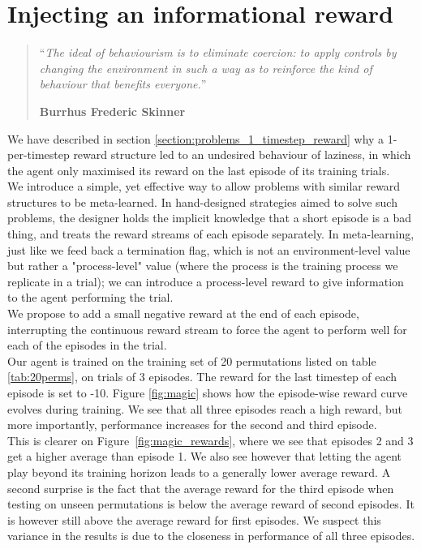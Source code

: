 \chapter{Injecting an informational reward}
\begin{quotation}
\noindent ``\emph{The ideal of behaviourism is to eliminate coercion: to apply
	controls by changing the environment in such a way as to reinforce the
	kind of behaviour that benefits everyone.}''
\begin{flushright}\textbf{Burrhus Frederic Skinner}\end{flushright}
\end{quotation}
\vspace*{0.5cm}


We have described in section \ref{section:problems_1_timestep_reward} why
a 1-per-timestep reward structure led to an undesired behaviour of laziness,
in which the agent only maximised its reward on the last episode of its
training trials.\\

We introduce a simple, yet effective way to allow problems with similar 
reward structures to be meta-learned. In hand-designed strategies aimed to
solve such problems, the designer holds the implicit knowledge that a short
episode is a bad thing, and treats the reward streams of each episode 
separately. In meta-learning, just like we feed back a termination flag, which
is not an environment-level value but rather a "process-level" value (where
the process is the training process we replicate in a trial); we can
introduce a process-level reward to give information to the agent 
performing the trial.\\

We propose to add a small negative reward at the end of each episode, 
interrupting the continuous reward stream to force the agent to perform
well for each of the episodes in the trial.\\

Our agent is trained on the training set of 20 permutations listed on table
\ref{tab:20perms}, on trials of 3 episodes. The reward for the last 
timestep of each episode is set to -10. Figure \ref{fig:magic} shows how
the episode-wise reward curve evolves during training. We see that all
three episodes reach a high reward, but more importantly, performance
increases for the second and third episode. \\

This is clearer on Figure~\ref{fig:magic_rewards}, where we see
that episodes 2 and 3 get a higher average than episode 1. We also see
however that letting the agent play beyond its training horizon leads to
a generally lower average reward. A second surprise is the fact that the
average reward for the third episode when testing on unseen permutations is
below the average reward of second episodes. It is however still above the average
reward for first episodes. We suspect this variance in the results is due
to the closeness in performance of all three episodes.\\

